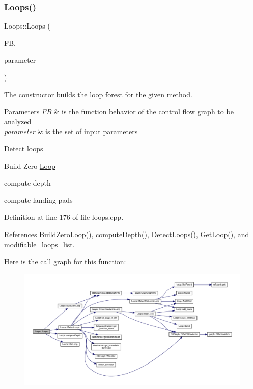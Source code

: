 \subsubsection{\texorpdfstring{Loops()}{Loops()}\hspace{0.1cm}{\footnotesize\ttfamily [2/2]}}
{\footnotesize\ttfamily Loops\+::\+Loops (\begin{DoxyParamCaption}\item[{const \hyperlink{function__behavior_8hpp_affbc6a46ab86ddfabe31c10986d333dc}{Function\+Behavior\+Ref}}]{FB,  }\item[{const \hyperlink{Parameter_8hpp_a37841774a6fcb479b597fdf8955eb4ea}{Parameter\+Const\+Ref}}]{parameter }\end{DoxyParamCaption})}



The constructor builds the loop forest for the given method. 


\begin{DoxyParams}{Parameters}
{\em FB} & is the function behavior of the control flow graph to be analyzed \\
\hline
{\em parameter} & is the set of input parameters \\
\hline
\end{DoxyParams}
Detect loops

Build Zero \hyperlink{classLoop}{Loop}

compute depth

compute landing pads 

Definition at line 176 of file loops.\+cpp.



References Build\+Zero\+Loop(), compute\+Depth(), Detect\+Loops(), Get\+Loop(), and modifiable\+\_\+loops\+\_\+list.

Here is the call graph for this function\+:
\nopagebreak
\begin{figure}[H]
\begin{center}
\leavevmode
\includegraphics[width=350pt]{d3/ded/classLoops_a4468afbab8156bb55299b15e35bb81ba_cgraph}
\end{center}
\end{figure}


